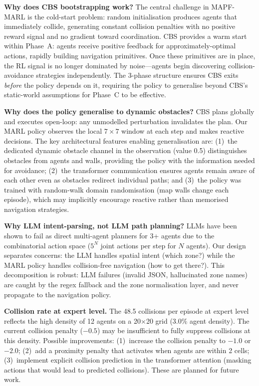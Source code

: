 \documentclass[letterpaper,twocolumn,10pt]{article}
\begin{document}
\textbf{Why does CBS bootstrapping work?}
The central challenge in MAPF-MARL is the cold-start problem: random initialisation
produces agents that immediately collide, generating constant collision penalties with
no positive reward signal and no gradient toward coordination. CBS provides a warm
start within Phase~A: agents receive positive feedback for approximately-optimal
actions, rapidly building navigation primitives. Once these primitives are in place,
the RL signal is no longer dominated by noise---agents begin discovering
collision-avoidance strategies independently. The 3-phase structure ensures CBS exits
\emph{before} the policy depends on it, requiring the policy to generalise beyond
CBS's static-world assumptions for Phase~C to be effective.

\textbf{Why does the policy generalise to dynamic obstacles?}
CBS plans globally and executes open-loop: any unmodelled perturbation invalidates the
plan. Our MARL policy observes the local $7\times 7$ window at each step and makes
reactive decisions. The key architectural features enabling generalisation are:
(1)~the dedicated dynamic obstacle channel in the observation (value 0.5) distinguishes
obstacles from agents and walls, providing the policy with the information needed for
avoidance; (2)~the transformer communication ensures agents remain aware of each other
even as obstacles redirect individual paths; and (3)~the policy was trained with
random-walk domain randomisation (map walls change each episode), which may implicitly
encourage reactive rather than memorised navigation strategies.

\textbf{Why LLM intent-parsing, not LLM path planning?}
LLMs have been shown to fail as direct multi-agent planners for 3+ agents due to the
combinatorial action space ($5^N$ joint actions per step for $N$ agents). Our design
separates concerns: the LLM handles spatial intent (which zone?) while the MARL policy
handles collision-free navigation (how to get there?). This decomposition is robust:
LLM failures (invalid JSON, hallucinated zone names) are caught by the regex fallback
and the zone normalisation layer, and never propagate to the navigation policy.

\textbf{Collision rate at expert level.}
The 48.5 collisions per episode at expert level reflects the high density of 12 agents
on a 20$\times$20 grid (3.0\% agent density). The current collision penalty ($-0.5$)
may be insufficient to fully suppress collisions at this density. Possible improvements:
(1)~increase the collision penalty to $-1.0$ or $-2.0$; (2)~add a proximity penalty
that activates when agents are within 2 cells; (3)~implement explicit collision
prediction in the transformer attention (masking actions that would lead to predicted
collisions). These are planned for future work.
\end{document}
